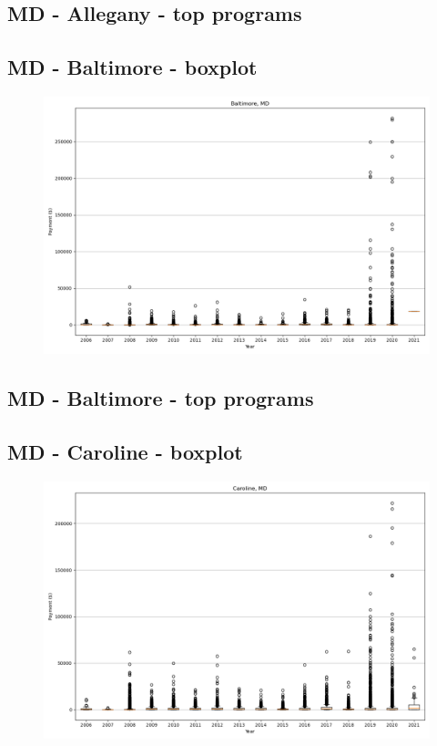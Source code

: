 \subsection*{MD - Allegany - top programs}

\newpage
\subsection*{MD - Baltimore - boxplot}
\begin{figure}[h]
\centering
\includegraphics[width=7in]{../output/boxplots/counties/Baltimore-MD_boxplot.png}
\end{figure}


\subsection*{MD - Baltimore - top programs}

\newpage
\subsection*{MD - Caroline - boxplot}
\begin{figure}[h]
\centering
\includegraphics[width=7in]{../output/boxplots/counties/Caroline-MD_boxplot.png}
\end{figure}


